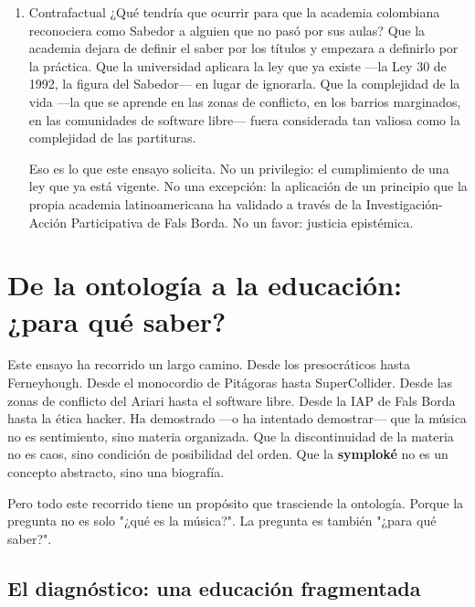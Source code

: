 \documentclass[14pt, a4paper]{article}
\begin{document}
\begin{enumerate}
La pregunta no es quién tiene razón. La pregunta es por qué la
complejidad de Ferneyhough es financiada con fondos públicos europeos
y la complejidad de un músico que ha atravesado retenes paramilitares
para enseñar a leer partituras en pueblos sin presencia estatal no
recibe apoyo alguno. La respuesta no es musical: es política. La
academia financia lo que se parece a ella.
\item Contrafactual
\label{ferneyhough-contrafactual}
¿Qué tendría que ocurrir para que la academia colombiana reconociera
como Sabedor a alguien que no pasó por sus aulas? Que la academia
dejara de definir el saber por los títulos y empezara a definirlo por
la práctica. Que la universidad aplicara la ley que ya existe —la Ley
30 de 1992, la figura del Sabedor— en lugar de ignorarla. Que la
complejidad de la vida —la que se aprende en las zonas de conflicto,
en los barrios marginados, en las comunidades de software libre—
fuera considerada tan valiosa como la complejidad de las partituras.

Eso es lo que este ensayo solicita. No un privilegio: el cumplimiento
de una ley que ya está vigente. No una excepción: la aplicación de un
principio que la propia academia latinoamericana ha validado a través
de la Investigación-Acción Participativa de Fals Borda. No un favor:
justicia epistémica.
\end{enumerate}
\section{De la ontología a la educación: ¿para qué saber?}
\label{ontologia-educacion}
Este ensayo ha recorrido un largo camino. Desde los presocráticos hasta
Ferneyhough. Desde el monocordio de Pitágoras hasta SuperCollider.
Desde las zonas de conflicto del Ariari hasta el software libre. Desde
la IAP de Fals Borda hasta la ética hacker. Ha demostrado —o ha
intentado demostrar— que la música no es sentimiento, sino materia
organizada. Que la discontinuidad de la materia no es caos, sino
condición de posibilidad del orden. Que la \textbf{symploké} no es un
concepto abstracto, sino una biografía.

Pero todo este recorrido tiene un propósito que trasciende la
ontología. Porque la pregunta no es solo "¿qué es la música?". La
pregunta es también "¿para qué saber?".
\subsection{El diagnóstico: una educación fragmentada}
\label{sec:orgecd8375}
\end{document}
